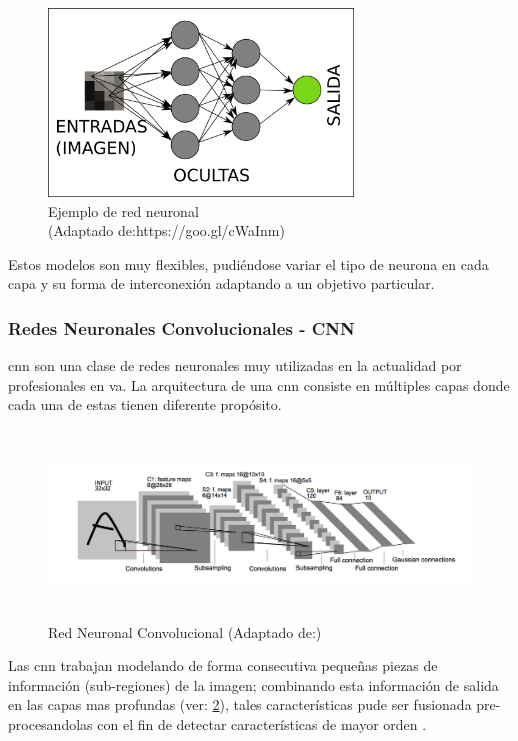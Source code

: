 \begin{figure}[H]
 \centering
  \includegraphics[height=5cm,keepaspectratio=true,clip=true]{imagenes/Logos/neural-net-sample1.png}
  \caption{Ejemplo de red neuronal  \\(Adaptado de:{https://goo.gl/cWaInm})}
	\label{Fig: redneuronal2}
\end{figure}
Estos modelos son  muy flexibles, pudiéndose variar el tipo de neurona en cada capa y su forma de interconexión adaptando a un objetivo particular.

\subsubsection{Redes Neuronales Convolucionales - CNN}

\ac{cnn} son una clase de redes neuronales muy utilizadas en la actualidad por profesionales en \ac{va}. La arquitectura de una \ac{cnn} consiste en múltiples capas donde cada una de estas tienen diferente propósito.

\begin{figure}[h]
 \centering
  \includegraphics[height=5cm,keepaspectratio=true,clip=true]{imagenes/Logos/cnnconv.png}
  \caption{Red Neuronal Convolucional (Adaptado de:\citep{cnns})}
	\label{Fig: redconvolucion}
\end{figure}

Las \ac{cnn} trabajan modelando de forma consecutiva pequeñas piezas de información (sub-regiones) de la imagen; combinando esta información de salida en las capas mas profundas (ver: \ref{Fig: redconvolucion}), tales características pude ser fusionada pre-procesandolas con el fin de detectar características de mayor orden \citep{murphy}.


